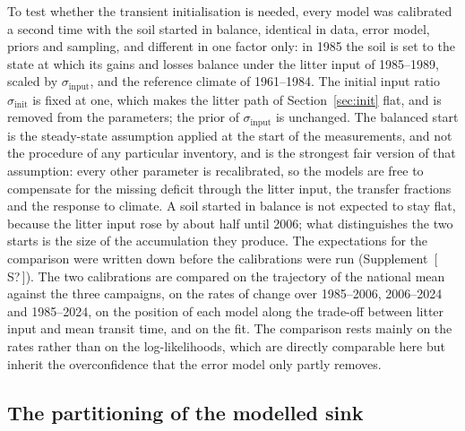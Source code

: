 \documentclass[11pt]{article}
\newcommand{\gap}[1]{\textcolor{red!70!black}{\small[\,#1\,]}}
\newcommand{\sinput}{\sigma_{\mathrm{input}}}
\newcommand{\sinit}{\sigma_{\mathrm{init}}}
\begin{document}
To test whether the transient initialisation is needed, every model was calibrated a second time
with the soil started in balance, identical in data, error model, priors and sampling, and
different in one factor only: in 1985 the soil is set to the state at which its gains and losses
balance under the litter input of 1985--1989, scaled by $\sinput$, and the reference climate of
1961--1984. The initial input ratio $\sinit$ is fixed at one, which makes the litter path of
Section~\ref{sec:init} flat, and is removed from the parameters; the prior of $\sinput$ is
unchanged. The balanced start is the steady-state assumption applied at the start of the
measurements, and not the procedure of any particular inventory, and is the strongest fair version
of that assumption: every other parameter is recalibrated, so the models are free to compensate for
the missing deficit through the litter input, the transfer fractions and the response to climate.
A soil started in balance is not expected to stay flat, because the litter input rose by about
half until 2006; what distinguishes the two starts is the size of the accumulation they produce.
The expectations for the comparison were written down before the calibrations were run
(Supplement~\gap{S?}).
The two calibrations are compared on the trajectory of the national mean against the three
campaigns, on the rates of change over 1985--2006, 2006--2024 and 1985--2024, on the position of
each model along the trade-off between litter input and mean transit time, and on the fit. The
comparison rests mainly on the rates rather than on the log-likelihoods, which are directly
comparable here but inherit the overconfidence that the error model only partly removes.


\subsection{The partitioning of the modelled sink}\label{sec:division}
\end{document}
